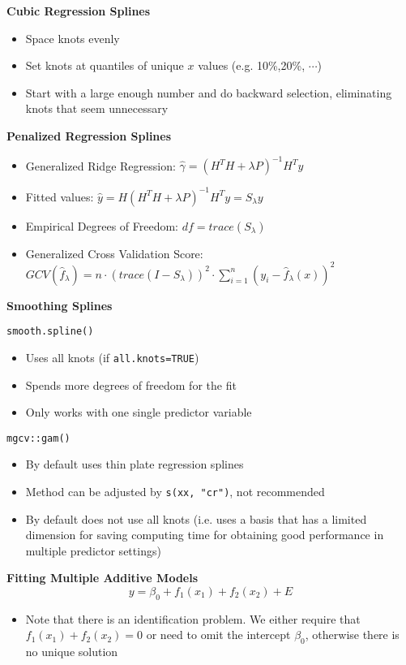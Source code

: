 \documentclass[a4paper]{article}
\begin{document}
\textbf{Cubic Regression Splines}
\begin{itemize}
    \item Space knots evenly
    \item Set knots at quantiles of unique $x$ values (e.g. 10\%,20\%, $\cdots$)
    \item Start with a large enough number and do backward selection, eliminating knots that seem unnecessary
\end{itemize}

\textbf{Penalized Regression Splines}
\begin{itemize}
    \item Generalized Ridge Regression: $\hat{\gamma}=(H^{T}H+\lambda P)^{-1}H^{T}y$
    \item Fitted values: $\hat{y}=H(H^{T}H+\lambda P)^{-1}H^{T}y=S_{\lambda}y$
    \item Empirical Degrees of Freedom: $df=trace(S_{\lambda})$
    \item Generalized Cross Validation Score: $GCV(\hat{f}_{\lambda})=n\cdot(trace(I-S_{\lambda}))^2\cdot\sum_{i=1}^{n}(y_i-\hat{f}_{\lambda}(x))^2$
\end{itemize}

\textbf{Smoothing Splines}

\texttt{smooth.spline()}
\begin{itemize}
    \item Uses all knots (if \texttt{all.knots=TRUE})
    \item Spends more degrees of freedom for the fit
    \item Only works with one single predictor variable
\end{itemize}

\texttt{mgcv::gam()}
\begin{itemize}
    \item By default uses thin plate regression splines
    \item Method can be adjusted by \texttt{s(xx, "cr")}, not recommended
    \item By default does not use all knots (i.e. uses a basis that has a limited dimension for saving computing time for obtaining good performance in multiple predictor settings)
\end{itemize}

\textbf{Fitting Multiple Additive Models}
\[y=\beta_0+f_1(x_1)+f_2(x_2)+E \]
\begin{itemize}
    \item Note that there is an identification problem. We either require that $f_1(x_1)+f_2(x_2)=0$ or need to omit the intercept $\beta_0$, otherwise there is no unique solution
\end{itemize}
\end{document}
